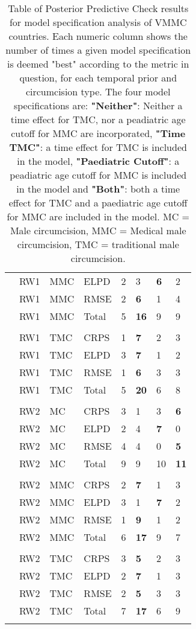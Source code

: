 \documentclass{article}
\begin{document}
{\begin{longtable}[c]{llllllll}
        & RW1 & MMC & ELPD & 2 & 3 & \bf{6} & 2 \\ 
        & RW1 & MMC & RMSE & 2 & \bf{6} & 1 & 4 \\ 
        \hline 
        & RW1 & MMC & Total & 5 & \bf{16} & 9 & 9 \\ 
        \hline \\ 
        & RW1 & TMC & CRPS & 1 & \bf{7} & 2 & 3 \\ 
        & RW1 & TMC & ELPD & 3 & \bf{7} & 1 & 2 \\ 
        & RW1 & TMC & RMSE & 1 & \bf{6} & 3 & 3 \\ 
        \hline 
        & RW1 & TMC & Total & 5 & \bf{20} & 6 & 8 \\ 
        \hline \\ 
        & RW2 & MC & CRPS & 3 & 1 & 3 & \bf{6} \\ 
        & RW2 & MC & ELPD & 2 & 4 & \bf{7} & 0 \\ 
        & RW2 & MC & RMSE & 4 & 4 & 0 & \bf{5} \\ 
        \hline 
        & RW2 & MC & Total & 9 & 9 & 10 & \bf{11} \\ 
        \hline \\ 
        & RW2 & MMC & CRPS & 2 & \bf{7} & 1 & 3 \\ 
        & RW2 & MMC & ELPD & 3 & 1 & \bf{7} & 2 \\ 
        & RW2 & MMC & RMSE & 1 & \bf{9} & 1 & 2 \\ 
        \hline 
        & RW2 & MMC & Total & 6 & \bf{17} & 9 & 7 \\ 
        \hline \\ 
        & RW2 & TMC & CRPS & 3 & \bf{5} & 2 & 3 \\ 
        & RW2 & TMC & ELPD & 2 & \bf{7} & 1 & 3 \\ 
        & RW2 & TMC & RMSE & 2 & \bf{5} & 3 & 3 \\ 
        \hline 
        & RW2 & TMC & Total & 7 & \bf{17} & 6 & 9 \\ 
        \bottomrule
    \caption{Table of Posterior Predictive Check results for model specification analysis of VMMC countries. 
    Each numeric column shows the number of times a given model specification is deemed "best" according to the metric in question, for each temporal prior and circumcision type. The four model specifications are: \textbf{"Neither"}: Neither a time effect for TMC, nor a peadiatric age cutoff for MMC are incorporated, \textbf{"Time TMC"}: a time effect for TMC is included in the model, \textbf{"Paediatric Cutoff"}: a peadiatric age cutoff for MMC is included in the model and \textbf{"Both"}: both a time effect for TMC and a paediatric age cutoff for MMC are included in the model. MC = Male circumcision, MMC = Medical male circumcision, TMC = traditional male circumcision.
    }
\end{longtable}
}
\end{document}
